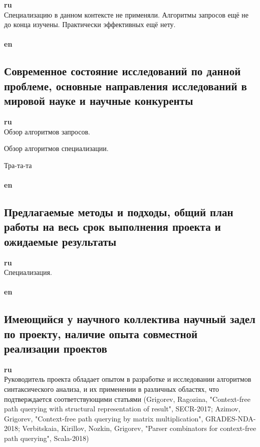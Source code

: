 \documentclass[12pt]{article}  %
\theoremstyle{remark}
\begin{document}
\textbf{ru}\\
%
Специализацию в данном контексте не применяли. Алгоритмы запросов ещё не до конца изучены. Практически эффективных ещё нету.
\\
\\
\textbf{en}\\

\subsection{Современное состояние исследований по данной проблеме, основные направления исследований в мировой науке и научные конкуренты}

\textbf{ru}\\
%
Обзор алгоритмов запросов.

Обзор алгоритмов специализации.

Тра-та-та
\\
\\
\textbf{en}\\

\subsection{Предлагаемые методы и подходы, общий план работы на весь срок выполнения проекта и ожидаемые результаты }

\textbf{ru}\\
Специализация.
\\
\\
\textbf{en}\\

\subsection{Имеющийся у научного коллектива научный задел по проекту, наличие опыта совместной реализации проектов}

\textbf{ru}\\
%
Руководитель проекта обладает опытом в разработке и исследовании алгоритмов синтаксического анализа, и их применении в различных областях, что подтверждается соответствующими статьями (Grigorev, Ragozina, "Context-free path querying with structural representation of result", SECR-2017; Azimov, Grigorev, "Context-free path querying by matrix multiplication", GRADES-NDA-2018; Verbitskaia, Kirillov, Nozkin, Grigorev, "Parser combinators for context-free path querying", Scala-2018)
\end{document}
